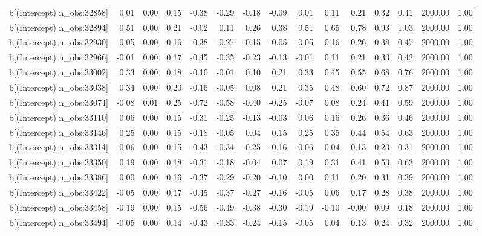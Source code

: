 \begin{table}[ht]
\begin{tabular}{rrrrrrrrrrrrrrr}
  b[(Intercept) n\_obs:32858] & 0.01 & 0.00 & 0.15 & -0.38 & -0.29 & -0.18 & -0.09 & 0.01 & 0.11 & 0.21 & 0.32 & 0.41 & 2000.00 & 1.00 \\ 
  b[(Intercept) n\_obs:32894] & 0.51 & 0.00 & 0.21 & -0.02 & 0.11 & 0.26 & 0.38 & 0.51 & 0.65 & 0.78 & 0.93 & 1.03 & 2000.00 & 1.00 \\ 
  b[(Intercept) n\_obs:32930] & 0.05 & 0.00 & 0.16 & -0.38 & -0.27 & -0.15 & -0.05 & 0.05 & 0.16 & 0.26 & 0.38 & 0.47 & 2000.00 & 1.00 \\ 
  b[(Intercept) n\_obs:32966] & -0.01 & 0.00 & 0.17 & -0.45 & -0.35 & -0.23 & -0.13 & -0.01 & 0.11 & 0.21 & 0.33 & 0.42 & 2000.00 & 1.00 \\ 
  b[(Intercept) n\_obs:33002] & 0.33 & 0.00 & 0.18 & -0.10 & -0.01 & 0.10 & 0.21 & 0.33 & 0.45 & 0.55 & 0.68 & 0.76 & 2000.00 & 1.00 \\ 
  b[(Intercept) n\_obs:33038] & 0.34 & 0.00 & 0.20 & -0.16 & -0.05 & 0.08 & 0.21 & 0.35 & 0.48 & 0.60 & 0.72 & 0.87 & 2000.00 & 1.00 \\ 
  b[(Intercept) n\_obs:33074] & -0.08 & 0.01 & 0.25 & -0.72 & -0.58 & -0.40 & -0.25 & -0.07 & 0.08 & 0.24 & 0.41 & 0.59 & 2000.00 & 1.00 \\ 
  b[(Intercept) n\_obs:33110] & 0.06 & 0.00 & 0.15 & -0.31 & -0.25 & -0.13 & -0.03 & 0.06 & 0.16 & 0.26 & 0.36 & 0.46 & 2000.00 & 1.00 \\ 
  b[(Intercept) n\_obs:33146] & 0.25 & 0.00 & 0.15 & -0.18 & -0.05 & 0.04 & 0.15 & 0.25 & 0.35 & 0.44 & 0.54 & 0.63 & 2000.00 & 1.00 \\ 
  b[(Intercept) n\_obs:33314] & -0.06 & 0.00 & 0.15 & -0.43 & -0.34 & -0.25 & -0.16 & -0.06 & 0.04 & 0.13 & 0.23 & 0.31 & 2000.00 & 1.00 \\ 
  b[(Intercept) n\_obs:33350] & 0.19 & 0.00 & 0.18 & -0.31 & -0.18 & -0.04 & 0.07 & 0.19 & 0.31 & 0.41 & 0.53 & 0.63 & 2000.00 & 1.00 \\ 
  b[(Intercept) n\_obs:33386] & 0.00 & 0.00 & 0.16 & -0.37 & -0.29 & -0.20 & -0.10 & 0.00 & 0.11 & 0.20 & 0.31 & 0.39 & 2000.00 & 1.00 \\ 
  b[(Intercept) n\_obs:33422] & -0.05 & 0.00 & 0.17 & -0.45 & -0.37 & -0.27 & -0.16 & -0.05 & 0.06 & 0.17 & 0.28 & 0.38 & 2000.00 & 1.00 \\ 
  b[(Intercept) n\_obs:33458] & -0.19 & 0.00 & 0.15 & -0.56 & -0.49 & -0.38 & -0.30 & -0.19 & -0.10 & -0.00 & 0.09 & 0.18 & 2000.00 & 1.00 \\ 
  b[(Intercept) n\_obs:33494] & -0.05 & 0.00 & 0.14 & -0.43 & -0.33 & -0.24 & -0.15 & -0.05 & 0.04 & 0.13 & 0.24 & 0.32 & 2000.00 & 1.00 \\ 

\end{tabular}
\end{table}
